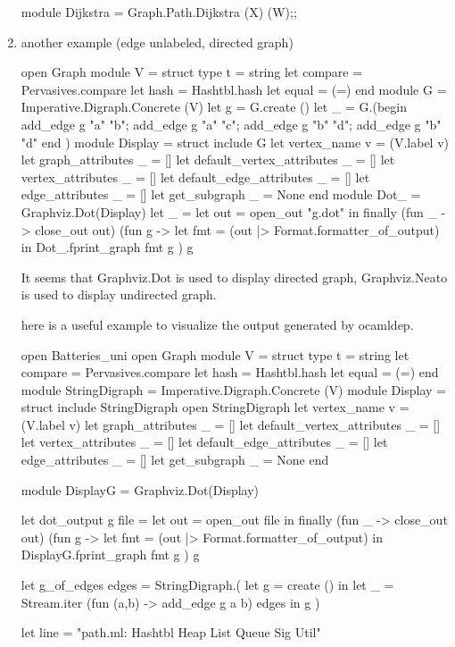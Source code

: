 \begin{enumerate}
\begin{bluetext}
module Dijkstra = Graph.Path.Dijkstra (X) (W);;
  
\end{bluetext}
\item another example (edge unlabeled, directed graph) 

  \begin{bluecode}
open Graph 
module V = struct
  type t = string
  let compare = Pervasives.compare
  let hash = Hashtbl.hash
  let equal = (=)
end
module G = Imperative.Digraph.Concrete (V)
let g = G.create ()
let _ = G.(begin 
  add_edge g "a" "b";
  add_edge g "a" "c";
  add_edge g "b" "d";
  add_edge g "b" "d"
end )
module Display = struct 
  include G
  let vertex_name v = (V.label v)
  let graph_attributes _ = []
  let default_vertex_attributes _ = []
  let vertex_attributes _ = []
  let default_edge_attributes _ = []
  let edge_attributes _ = []
  let get_subgraph _ = None
end 
module Dot_ = Graphviz.Dot(Display)
let _ = 
  let out = open_out "g.dot" in
  finally (fun _ -> close_out out) (fun g -> 
    let fmt =
      (out |> Format.formatter_of_output) in 
    Dot_.fprint_graph fmt g ) g
  \end{bluecode}
  It seems that Graphviz.Dot is used to display directed graph, Graphviz.Neato is used to display undirected graph.

  here is a useful example to visualize the output generated by ocamldep.
  \begin{bluecode}
open Batteries_uni 
open Graph 
module V = struct
  type t = string
  let compare = Pervasives.compare
  let hash = Hashtbl.hash
  let equal = (=)
end
module StringDigraph = Imperative.Digraph.Concrete (V)
module Display = struct 
  include StringDigraph
  open StringDigraph
  let vertex_name v = (V.label v)
  let graph_attributes _ = []
  let default_vertex_attributes _ = []
  let vertex_attributes _ = []
  let default_edge_attributes _ = []
  let edge_attributes _ = []
  let get_subgraph _ = None
end 

module DisplayG = Graphviz.Dot(Display)


let dot_output g file = 
  let out = open_out file in
  finally (fun _ -> close_out out) (fun g -> 
    let fmt =
      (out |> Format.formatter_of_output) in 
    DisplayG.fprint_graph fmt g ) g


let g_of_edges edges = StringDigraph.(
  let g = create () in 
  let _ = Stream.iter (fun (a,b) -> add_edge g a  b) edges in
  g 
)

let line = "path.ml: Hashtbl Heap List Queue Sig Util"


\end{bluecode}
\end{enumerate}
